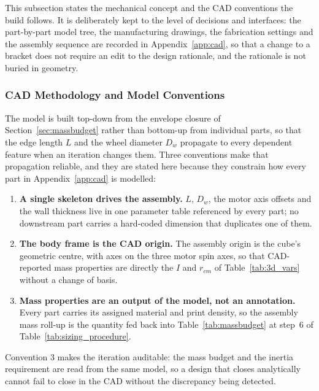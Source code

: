 This subsection states the mechanical concept and the CAD conventions the build
follows. It is deliberately kept to the level of decisions and interfaces:
the part-by-part model tree, the manufacturing drawings, the fabrication
settings and the assembly sequence are recorded in
Appendix~\ref{app:cad}, so that a change to a bracket does not require an
edit to the design rationale, and the rationale is not buried in geometry.

\subsubsection{CAD Methodology and Model Conventions}
\label{sec:cad_method}

The model is built top-down from the envelope closure of
Section~\ref{sec:massbudget} rather than bottom-up from individual parts, so
that the edge length $L$ and the wheel diameter $D_w$ propagate to every
dependent feature when an iteration changes them. Three conventions make that
propagation reliable, and they are stated here because they constrain how every
part in Appendix~\ref{app:cad} is modelled:

\begin{enumerate}
  \item \textbf{A single skeleton drives the assembly.} $L$, $D_w$, the motor
        axis offsets and the wall thickness live in one parameter table
        referenced by every part; no downstream part carries a hard-coded
        dimension that duplicates one of them.
  \item \textbf{The body frame is the CAD origin.} The assembly origin is the
        cube's geometric centre, with axes on the three motor spin axes, so
        that CAD-reported mass properties are directly the $I$ and $r_{cm}$ of
        Table~\ref{tab:3d_vars} without a change of basis.
  \item \textbf{Mass properties are an output of the model, not an annotation.}
        Every part carries its assigned material and print density, so the
        assembly mass roll-up is the quantity fed back into
        Table~\ref{tab:massbudget} at step~6 of
        Table~\ref{tab:sizing_procedure}.
\end{enumerate}

Convention 3 makes the iteration auditable: the mass budget and the inertia
requirement are read from the same model, so a design that closes analytically
cannot fail to close in the CAD without the discrepancy being detected.

